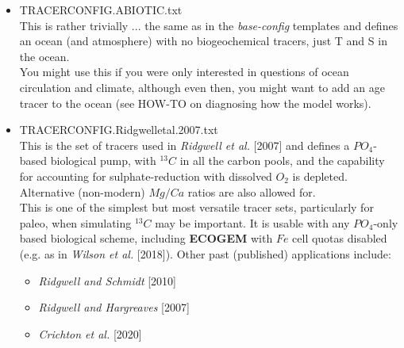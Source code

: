 \documentclass[11pt,fleqn]{book} %
\begin{document}
\begin{itemize}[noitemsep]

\vspace{2mm}
\item \textsf{\small TRACERCONFIG.ABIOTIC.txt}
\vspace{1mm}
\\This is rather trivially ... the same as in the \textit{base-config} templates and defines an ocean (and atmosphere) with no biogeochemical tracers, just T and S in the ocean.
\\You might use this if you were only interested in questions of ocean circulation and climate, although even then, you might want to add an age tracer to the ocean (see HOW-TO on diagnosing how the model works).

\vspace{2mm}
\item \textsf{\small TRACERCONFIG.Ridgwelletal.2007.txt}
\vspace{1mm}
\\This is the set of tracers used in \textit{Ridgwell et al.} [2007] and defines a \(PO_{4}\)-based biological pump, with \(^{13}C\) in all the carbon pools, and the capability for accounting for sulphate-reduction with dissolved \(O_{2}\) is depleted. Alternative (non-modern) \(Mg/Ca\) ratios are also allowed for.
\\This is one of the simplest but most versatile tracer sets, particularly for paleo, when simulating \(^{13}C\) may be important. It is usable with any \(PO_{4}\)-only based biological scheme, including \textbf{ECOGEM} with \(Fe\) cell quotas disabled (e.g. as in \textit{Wilson et al.} [2018]). Other past (published) applications include:
\begin{itemize}[noitemsep]
\item \textit{Ridgwell and Schmidt} [2010]
\item \textit{Ridgwell and Hargreaves} [2007]
\item \textit{Crichton et al.} [2020]
\end{itemize}


\end{itemize}
\end{document}
